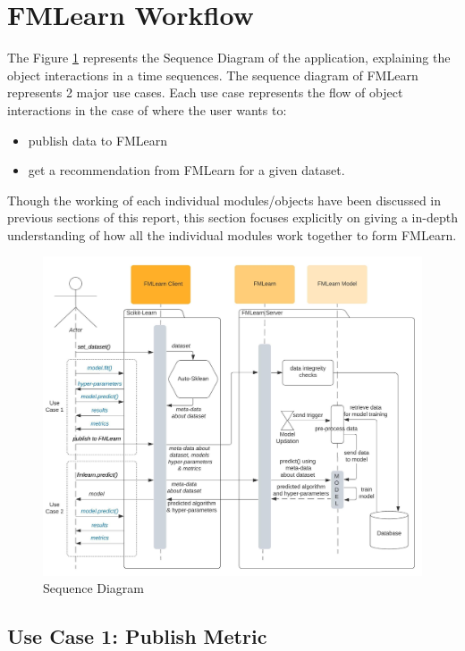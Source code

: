 \section{FMLearn Workflow}

The Figure \ref{sequence-diagram} represents the Sequence Diagram of the application, explaining the object interactions in a time sequences. The sequence diagram of FMLearn represents 2 major use cases. Each use case represents the flow of object interactions in the case of where the user wants to:
\begin{itemize}
    \item publish data to FMLearn
    \item get a recommendation from FMLearn for a given dataset.
\end{itemize}

Though the working of each individual modules/objects have been discussed in previous sections of this report, this section focuses explicitly on giving a in-depth understanding of how all the individual modules work together to form FMLearn.

\begin{figure}[t]
    \centering
    \includegraphics[width=15cm]{images/Sequence Diagram.jpeg}
    \caption{Sequence Diagram}
    \label{sequence-diagram}
\end{figure}

\subsection*{Use Case 1: Publish Metric}

